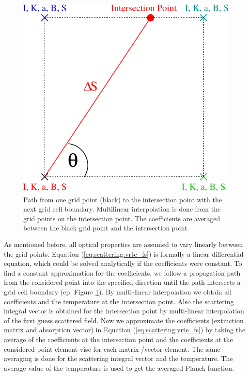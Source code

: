 \begin{figure}[htbp]
 \begin{center}
  \begin{minipage}[c]{0.65\textwidth}
   \begin{center}
     \includegraphics*[width=0.9\hsize]{Figs/scattering/average}
   \end{center}
  \end{minipage}%
  \begin{minipage}[c]{0.35\textwidth}
   \caption{Path from one grid point (black) to the intersection point with the next grid cell boundary. Multilinear interpolation is done from the grid points on the intersection point. The coefficients are averaged between the black grid point and the intersection point.}
   \label{fig:scattering:averaging}
  \end{minipage}
 \end{center}
\end{figure}   

As mentioned before, all optical properties are assumed to vary
linearly between the grid points. Equation
(\ref{eq:scattering:vrte_fs}) is formally a linear differential
equation, which could be solved analytically if the coefficients were
constant.  To find a constant approximation for the coefficients, we
follow a propagation path from the considered point into the specified
direction until the path intersects a grid cell boundary (cp. Figure
\ref{fig:scattering:averaging}). By multi-linear interpolation we
obtain all coefficients and the temperature at the intersection point.
Also the scattering integral vector is obtained for the intersection
point by multi-linear interpolation of the first guess scattered
field. Now we approximate the coefficients (extinction matrix and
absorption vector) in Equation (\ref{eq:scattering:vrte_fs}) by taking
the average of the coefficients at the intersection point and the
coefficients at the considered point element-vise for each
matrix-/vector-element. The same averaging is done for the scattering
integral vector and the temperature. The average value of the
temperature is used to get the averaged Planck function.

